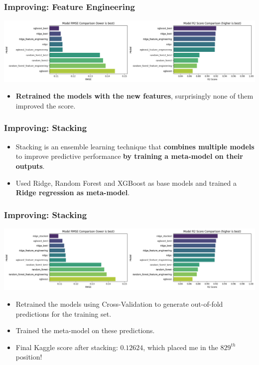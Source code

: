 \documentclass{beamer}
\begin{document}
\begin{frame}
\frametitle{Improving: Feature Engineering}
\centering
    \includegraphics[width=.9\textwidth]{../challenge/main_files/main_85_0.png}

\begin{itemize}
    \item \textbf{Retrained the models with the new features}, surprisingly none of them improved the score.
\end{itemize}
\end{frame}

\begin{frame}
\frametitle{Improving: Stacking}

\begin{itemize}
    \item Stacking is an ensemble learning technique that \textbf{combines multiple models} to improve predictive performance \textbf{by training a meta-model on their outputs}.
    \item Used Ridge, Random Forest and XGBoost as base models and trained a \textbf{Ridge regression as meta-model}.
\end{itemize}
\end{frame}

\begin{frame}
\frametitle{Improving: Stacking}
\centering
    \includegraphics[width=.9\textwidth]{../challenge/main_files/main_91_1.png}

\begin{itemize}
    \item Retrained the models using Cross-Validation to generate out-of-fold predictions for the training set.
    \item Trained the meta-model on these predictions.
    \item Final Kaggle score after stacking: $0.12624$, which placed me in the $829^{th}$ position!
\end{itemize}
\end{frame}
\end{document}
